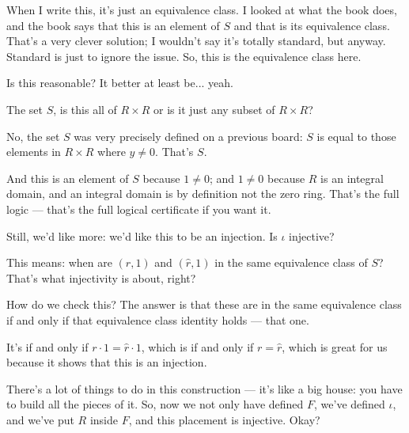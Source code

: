 \begin{speech}[00:54:22 - 00:54:54]
When I write this, it's just an equivalence class. I looked at what the book does, and the book says that this is an element of $S$ and that is its equivalence class. That's a very clever solution; I wouldn't say it's totally standard, but anyway. Standard is just to ignore the issue. So, this is the equivalence class here.

Is this reasonable? It better at least be... yeah.
\end{speech}

\begin{student}
The set $S$, is this all of $R \times R$ or is it just any subset of $R \times R$?
\end{student}

\begin{speech}[00:55:00 - 00:55:28]
No, the set $S$ was very precisely defined on a previous board: $S$ is equal to those elements in $R \times R$ where $y \neq 0$.  That's $S$.

And this is an element of $S$ because $1 \neq 0$; and $1 \neq 0$ because $R$ is an integral domain, and an integral domain is by definition not the zero ring. That's the full logic --- that's the full logical certificate if you want it.
\end{speech}

\begin{speech}[00:55:28 - 00:57:05]
Still, we'd like more: we'd like this to be an injection. Is $\iota$ injective? 

This means: when are $(r, 1)$ and $(\hat{r}, 1)$ in the same equivalence class of $S$?  That's what injectivity is about, right?

How do we check this? The answer is that these are in the same equivalence class if and only if that equivalence class identity holds --- that one. 

It's if and only if $r \cdot 1 = \hat{r} \cdot 1$,  which is if and only if $r = \hat{r}$,  which is great for us because it shows that this is an injection. 

There's a lot of things to do in this construction --- it's like a big house: you have to build all the pieces of it. So, now we not only have defined $F$, we've defined $\iota$, and we've put $R$ inside $F$, and this placement is injective. Okay?
\end{speech}

